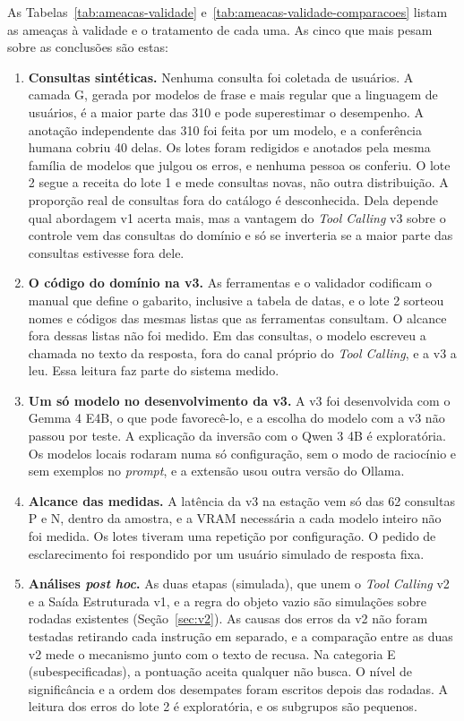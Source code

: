 As Tabelas~\ref{tab:ameacas-validade} e~\ref{tab:ameacas-validade-comparacoes} listam as ameaças à validade e o tratamento de cada uma. As cinco que mais pesam sobre as conclusões são estas:
\begin{enumerate}
  \item \textbf{Consultas sintéticas.} Nenhuma consulta foi coletada de usuários. A camada G, gerada por modelos de frase e mais regular que a linguagem de usuários, é a maior parte das 310 e pode superestimar o desempenho. A anotação independente das 310 foi feita por um modelo, e a conferência humana cobriu 40 delas. Os lotes foram redigidos e anotados pela mesma família de modelos que julgou os erros, e nenhuma pessoa os conferiu. O lote 2 segue a receita do lote 1 e mede consultas novas, não outra distribuição. A proporção real de consultas fora do catálogo é desconhecida. Dela depende qual abordagem v1 acerta mais, mas a vantagem do \textit{Tool Calling} v3 sobre o controle vem das consultas do domínio e só se inverteria se a maior parte das consultas estivesse fora dele.
  \item \textbf{O código do domínio na v3.} As ferramentas e o validador codificam o manual que define o gabarito, inclusive a tabela de datas, e o lote 2 sorteou nomes e códigos das mesmas listas que as ferramentas consultam. O alcance fora dessas listas não foi medido. Em  das consultas, o modelo escreveu a chamada no texto da resposta, fora do canal próprio do \textit{Tool Calling}, e a v3 a leu. Essa leitura faz parte do sistema medido.
  \item \textbf{Um só modelo no desenvolvimento da v3.} A v3 foi desenvolvida com o Gemma 4 E4B, o que pode favorecê-lo, e a escolha do modelo com a v3 não passou por teste. A explicação da inversão com o Qwen 3 4B é exploratória. Os modelos locais rodaram numa só configuração, sem o modo de raciocínio e sem exemplos no \textit{prompt}, e a extensão usou outra versão do Ollama.
  \item \textbf{Alcance das medidas.} A latência da v3 na estação vem só das 62 consultas P e N, dentro da amostra, e a VRAM necessária a cada modelo inteiro não foi medida. Os lotes tiveram uma repetição por configuração. O pedido de esclarecimento foi respondido por um usuário simulado de resposta fixa.
  \item \textbf{Análises \textit{post hoc}.} As duas etapas (simulada), que unem o \textit{Tool Calling} v2 e a Saída Estruturada v1, e a regra do objeto vazio são simulações sobre rodadas existentes (Seção~\ref{sec:v2}). As causas dos erros da v2 não foram testadas retirando cada instrução em separado, e a comparação entre as duas v2 mede o mecanismo junto com o texto de recusa. Na categoria E (subespecificadas), a pontuação aceita qualquer não busca. O nível de significância e a ordem dos desempates foram escritos depois das rodadas. A leitura dos erros do lote 2 é exploratória, e os subgrupos são pequenos.
\end{enumerate}

